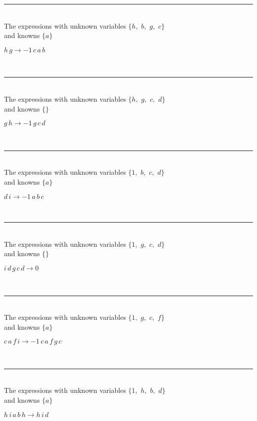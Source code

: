 \rule[3pt]{6in}{.7pt}\\
The expressions with unknown variables $\{h,
$ $
b,
$ $
g,
$ $
c\}$\\
and knowns $\{a\}$\smallskip\\
\begin{minipage}{6in}
$
h\,
 g\rightarrow -1\,
 c\,
 a\,
 b
$
\end{minipage}\\
\rule[3pt]{6in}{.7pt}\\
The expressions with unknown variables $\{h,
$ $
g,
$ $
c,
$ $
d\}$\\
and knowns $\{\}$\smallskip\\
\begin{minipage}{6in}
$
g\,
 h\rightarrow -1\,
 g\,
 c\,
 d
$
\end{minipage}\\
\rule[3pt]{6in}{.7pt}\\
The expressions with unknown variables $\{1,
$ $
b,
$ $
c,
$ $
d\}$\\
and knowns $\{a\}$\smallskip\\
\begin{minipage}{6in}
$
d\,
 i\rightarrow -1\,
 a\,
 b\,
 c
$
\end{minipage}\\
\rule[3pt]{6in}{.7pt}\\
The expressions with unknown variables $\{1,
$ $
g,
$ $
c,
$ $
d\}$\\
and knowns $\{\}$\smallskip\\
\begin{minipage}{6in}
$
i\,
 d\,
 g\,
 c\,
 d\rightarrow 0
$
\end{minipage}\\
\rule[3pt]{6in}{.7pt}\\
The expressions with unknown variables $\{1,
$ $
g,
$ $
c,
$ $
f\}$\\
and knowns $\{a\}$\smallskip\\
\begin{minipage}{6in}
$
c\,
 a\,
 f\,
 i\rightarrow -1\,
 c\,
 a\,
 f\,
 g\,
 c
$
\end{minipage}\\
\rule[3pt]{6in}{.7pt}\\
The expressions with unknown variables $\{1,
$ $
h,
$ $
b,
$ $
d\}$\\
and knowns $\{a\}$\smallskip\\
\begin{minipage}{6in}
$
h\,
 i\,
 a\,
 b\,
 h\rightarrow h\,
 i\,
 d
$
\end{minipage}\\

